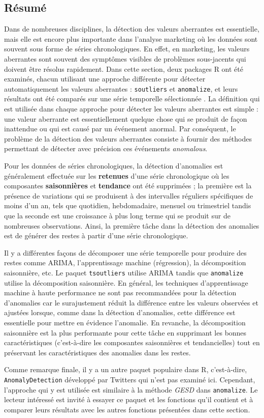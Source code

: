 \afterpage{\FloatBarrier} 

\subsection{Résumé}
Dans de nombreuses disciplines, la détection des valeurs aberrantes est essentielle, mais elle est encore plus importante dans l'analyse marketing où les données sont souvent sous forme de séries chronologiques.  En effet, en marketing, les valeurs aberrantes sont souvent des symptômes visibles de problèmes sous-jacents qui doivent être résolus rapidement. Dans cette section, deux packages R ont été examinés, chacun utilisant une approche différente pour détecter automatiquement les valeurs aberrantes : \verb|soutliers| et \verb|anomalize|, et leurs résultats ont été comparés sur une série temporelle sélectionnée . La définition qui est utilisée dans chaque approche pour détecter les valeurs aberrantes est simple : une valeur aberrante est essentiellement quelque chose qui se produit de façon inattendue ou qui est causé par un événement anormal. Par conséquent, le problème de la détection des valeurs aberrantes consiste à fournir des méthodes permettant de détecter avec précision ces événements \textit{anomalous}. \par Pour les données de séries chronologiques, la détection d'anomalies est généralement effectuée sur les \textbf{retenues} d'une série chronologique où les composantes \textbf{saisonnières} et \textbf{tendance} ont été supprimées ; la première est la présence de variations qui se produisent à des intervalles réguliers spécifiques de moins d'un an, tels que quotidien, hebdomadaire, mensuel ou trimestriel tandis que la seconde est une croissance à plus long terme qui se produit sur de nombreuses observations. Ainsi, la première tâche dans la détection des anomalies est de générer des restes à partir d'une série chronologique. \par Il y a différentes façons de décomposer une série temporelle pour produire des restes comme ARIMA, l'apprentissage machine (régression), la décomposition saisonnière, etc. Le paquet \verb|tsoutliers| utilise ARIMA tandis que \verb|anomalize| utilise la décomposition saisonnière. En général, les techniques d'apprentissage machine à haute performance ne sont pas recommandées pour la détection d'anomalies car le surajustement réduit la différence entre les valeurs observées et ajustées lorsque, comme dans la détection d'anomalies, cette différence est essentielle pour mettre en évidence l'anomalie. En revanche, la décomposition saisonnière est la plus performante pour cette tâche en supprimant les bonnes caractéristiques (c'est-à-dire les composantes saisonnières et tendancielles) tout en préservant les caractéristiques des anomalies dans les restes. \par Comme remarque finale, il y a un autre paquet populaire dans R, c'est-à-dire, \verb|AnomalyDetection| développé par Twitters qui n'est pas examiné ici. Cependant, l'approche qui y est utilisée est similaire à la méthode \textit{GESD} dans \verb|anomalize|. Le lecteur intéressé est invité à essayer ce paquet et les fonctions qu'il contient et à comparer leurs résultats avec les autres fonctions présentées dans cette section.